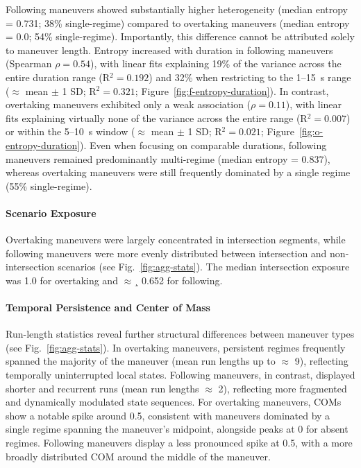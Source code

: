 Following maneuvers showed substantially higher heterogeneity (median entropy = 0.731; 38\% single-regime) compared to overtaking maneuvers (median entropy = 0.0; 54\% single-regime). Importantly, this difference cannot be attributed solely to maneuver length. Entropy increased with duration in following maneuvers (Spearman $\rho = 0.54$), with linear fits explaining 19\% of the variance across the entire duration range (R$^2 = 0.192$) and 32\% when restricting to the 1–15~s range ($\approx$ mean $\pm$ 1 SD; R$^2 = 0.321$; Figure~\ref{fig:f-entropy-duration}). In contrast, overtaking maneuvers exhibited only a weak association ($\rho = 0.11$), with linear fits explaining virtually none of the variance across the entire range (R$^2 = 0.007$) or within the 5–10~s window ($\approx$ mean $\pm$ 1 SD; R$^2 = 0.021$; Figure~\ref{fig:o-entropy-duration}). Even when focusing on comparable durations, following maneuvers remained predominantly multi-regime (median entropy = 0.837), whereas overtaking maneuvers were still frequently dominated by a single regime (55\% single-regime).


\paragraph{Scenario Exposure}
Overtaking maneuvers were largely concentrated in intersection segments, while following maneuvers were more evenly distributed between intersection and non-intersection scenarios (see Fig.~\ref{fig:agg-stats}). The median intersection exposure was 1.0 for overtaking and $ \approx¸ $ 0.652 for following.


\paragraph{Temporal Persistence and Center of Mass}
Run-length statistics reveal further structural differences between maneuver types (see Fig.~\ref{fig:agg-stats}). In overtaking maneuvers, persistent regimes frequently spanned the majority of the maneuver (mean run lengths up to $ \approx $ 9), reflecting temporally uninterrupted local states. Following maneuvers, in contrast, displayed shorter and recurrent runs (mean run lengths $ \approx $ 2), reflecting more fragmented and dynamically modulated state sequences.
For overtaking maneuvers, COMs show a notable spike around 0.5, consistent with maneuvers dominated by a single regime spanning the maneuver’s midpoint, alongside peaks at 0 for absent regimes. Following maneuvers display a less pronounced spike at 0.5, with a more broadly distributed COM around the middle of the maneuver.

